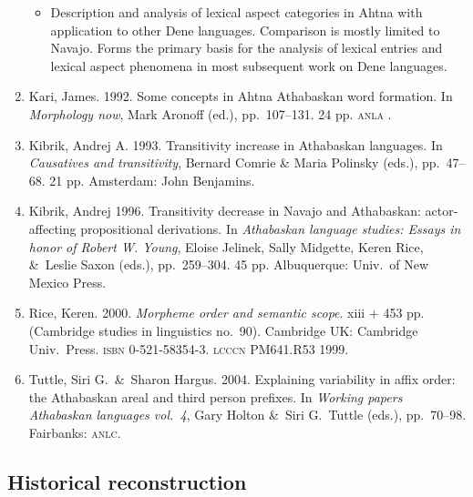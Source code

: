 \documentclass[12pt,letterpaper,oneside,article]{memoir}
\begin{document}
\begin{enumerate}
\begin{itemize}
	\item	Description and analysis of lexical aspect categories in Ahtna with
		application to other Dene languages.
		Comparison is mostly limited to Navajo.
		Forms the primary basis for the analysis of lexical entries and
		lexical aspect phenomena in most subsequent work on Dene languages.
	\end{itemize}
\item	Kari, James.
	1992.
	Some concepts in Ahtna Athabaskan word formation.
	In \textit{Morphology now}, Mark Aronoff (ed.), pp.\ 107–131.
	24 pp.
	\textsc{anla} .
\item	Kibrik, Andrej A.
	1993.
	Transitivity increase in Athabaskan languages.
	In \textit{Causatives and transitivity}, Bernard Comrie \& Maria Polinsky (eds.),
	pp.\ 47–68.
	21 pp.
	Amsterdam: John Benjamins.
\item	Kibrik, Andrej 
	1996.
	Transitivity decrease in Navajo and Athabaskan: actor-affecting propositional
	derivations.
	In \textit{Athabaskan language studies: Essays in honor of Robert W. Young},
	Eloise Jelinek, Sally Midgette, Keren Rice, \&\ Leslie Saxon (eds.),
	pp.\ 259–304.
	45 pp.
	Albuquerque: Univ.\ of New Mexico Press.
\item	Rice, Keren.
	2000.
	\textit{Morpheme order and semantic scope}.
	xiii + 453 pp.
	(Cambridge studies in linguistics no.\ 90).
	Cambridge UK: Cambridge Univ.\ Press.
	\textsc{isbn} 0-521-58354-3.
	\textsc{lcccn} PM641.R53 1999.
\item	Tuttle, Siri G.\ \&\ Sharon Hargus. 2004.
	Explaining variability in affix order: the Athabaskan areal and third person prefixes.
	In \textit{Working papers Athabaskan languages vol.\ 4},
	Gary Holton \&\ Siri G.\ Tuttle (eds.),
	pp.\ 70–98.
	Fairbanks: \textsc{anlc}.
\end{enumerate}

\subsection{Historical reconstruction}\label{sec:comphist-hist}
\end{document}
